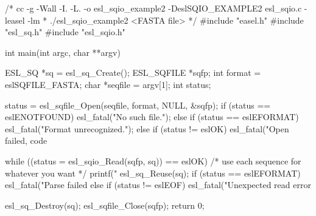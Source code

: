 \begin{cchunk}
/* cc -g -Wall -I. -L. -o esl_sqio_example2 -DeslSQIO_EXAMPLE2 esl_sqio.c -leasel -lm
 * ./esl_sqio_example2 <FASTA file>
 */
#include "easel.h"
#include "esl_sq.h"
#include "esl_sqio.h"

int
main(int argc, char **argv)
{
  ESL_SQ     *sq      = esl_sq_Create();
  ESL_SQFILE *sqfp;
  int         format  = eslSQFILE_FASTA;
  char       *seqfile = argv[1];
  int         status;

  status = esl_sqfile_Open(seqfile, format, NULL, &sqfp);
  if      (status == eslENOTFOUND) esl_fatal("No such file.");
  else if (status == eslEFORMAT)   esl_fatal("Format unrecognized.");
  else if (status != eslOK)        esl_fatal("Open failed, code %

  while ((status = esl_sqio_Read(sqfp, sq)) == eslOK)
  {     /* use each sequence for whatever you want */
    printf("%
    esl_sq_Reuse(sq);
  }
  if      (status == eslEFORMAT) esl_fatal("Parse failed\n  %
  else if (status != eslEOF)     esl_fatal("Unexpected read error %
  
  esl_sq_Destroy(sq);
  esl_sqfile_Close(sqfp);
  return 0;
}
\end{cchunk}

